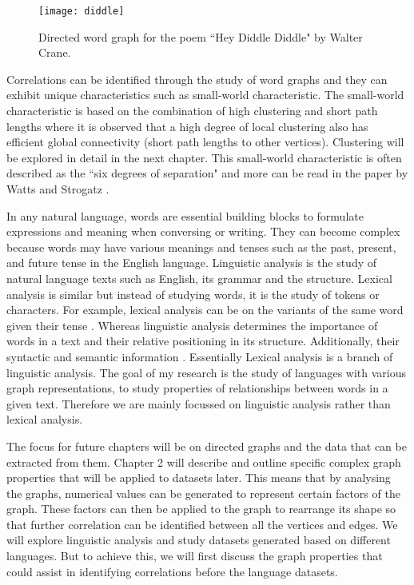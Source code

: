 \begin{figure}[!htb]
\centering
\texttt{[image: diddle]}
\caption{Directed word graph for the poem ``Hey Diddle Diddle" by Walter Crane.}
\label{fig:diddle}
\end{figure}

Correlations can be identified through the study of word graphs and they can exhibit unique characteristics such as small-world characteristic. The small-world characteristic is based on the combination of high clustering and short path lengths where it is observed that a high degree of local clustering also has efficient global connectivity (short path lengths to other vertices). Clustering will be explored in detail in the next chapter. This small-world characteristic is often described as the ``six degrees of separation" and more can be read in the paper by Watts and Strogatz \cite{watts1998collective}. 

In any natural language, words are essential building blocks to formulate expressions and meaning when conversing or writing. They can become complex because words may have various meanings and tenses such as the past, present, and future tense in the English language. Linguistic analysis is the study of natural language texts such as English, its grammar and the structure. Lexical analysis is similar but instead of studying words, it is the study of tokens or characters. For example, lexical analysis can be on the variants of the same word given their tense \cite{hippisley2010lexical}. Whereas linguistic analysis determines the importance of words in a text and their relative positioning in its structure. Additionally, their syntactic and semantic information \cite{broekman2021linguistic}. Essentially Lexical analysis is a branch of linguistic analysis. The goal of my research is the study of languages with various graph representations, to study properties of relationships between words in a given text. Therefore we are mainly focussed on linguistic analysis rather than lexical analysis.

The focus for future chapters will be on directed graphs and the data that can be extracted from them. Chapter 2 will describe and outline specific complex graph properties that will be applied to datasets later. This means that by analysing the graphs, numerical values can be generated to represent certain factors of the graph. These factors can then be applied to the graph to rearrange its shape so that further correlation can be identified between all the vertices and edges. We will explore linguistic analysis and study datasets generated based on different languages. But to achieve this, we will first discuss the graph properties that could assist in identifying correlations before the language datasets.